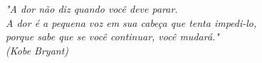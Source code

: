 \begin{epigrafe}
    \vspace*{\fill}
	\begin{flushright}
    \textit{"A dor não diz quando você deve parar.\\ 
             A dor é a pequena voz em sua cabeça que tenta impedi-lo, \\
             porque sabe que se você continuar, você mudará."\\
             (Kobe Bryant)}
	\end{flushright}
\end{epigrafe}
